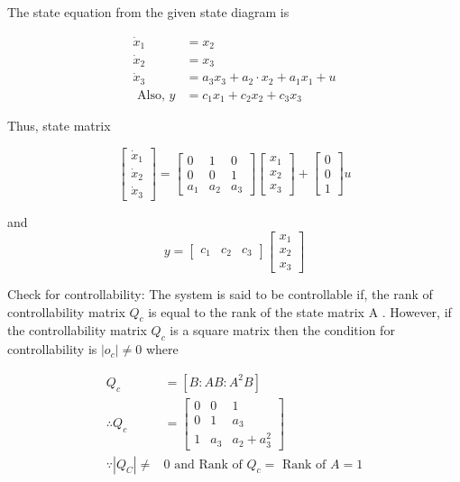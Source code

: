 \documentclass[11pt,a4paper]{article}
\begin{document}
\begin{tcolorbox}[solbox, title=Detailed Solution -- Question 99]
The state equation from the given state diagram is

\[
\begin{aligned} \dot{x}_{1} &=x_{2} \\ \dot{x}_{2} &=x_{3} \\ \dot{x}_{3} &=a_{3} x_{3}+a_{2} \cdot x_{2}+a_{1} x_{1}+u \\ \text { Also, } y &=c_{1} x_{1}+c_{2} x_{2}+c_{3} x_{3} \end{aligned}
\]

 Thus, state matrix 

\[
\left[\begin{array}{c}\dot{x}_{1} \\ \dot{x}_{2} \\ \dot{x}_{3}\end{array}\right]=\left[\begin{array}{ccc}0 & 1 & 0 \\ 0 & 0 & 1 \\ a_{1} & a_{2} & a_{3}\end{array}\right]\left[\begin{array}{c}x_{1} \\ x_{2} \\ x_{3}\end{array}\right]+\left[\begin{array}{c}0 \\ 0 \\ 1\end{array}\right] u
\]

 and 
\[
y=\left[\begin{array}{lll}c_{1} & c_{2} & c_{3}\end{array}\right]\left[\begin{array}{l}x_{1} \\ x_{2} \\ x_{3}\end{array}\right]
\]

 Check for controllability:
 The system is said to be controllable if, the rank  of controllability matrix $Q_{c}$ is equal to the rank of the state matrix A . However, if the controllability matrix $Q_{c}$ is a square matrix then the condition for controllability is
$\left|o_{c}\right| \neq 0$
 where 

\[
\begin{aligned} Q_{c}&=\left[B: A B: A^{2} B\right]\\ \therefore Q_{c}&=\left[\begin{array}{ccc}0 & 0 & 1 \\ 0 & 1 & a_{3} \\ 1 & a_{3} & a_{2}+a_{3}^{2}\end{array}\right] \\ \because\left|Q_{C}\right| \neq & 0 \text{ and Rank of } Q_{c}=\text{ Rank of }A=1 \end{aligned}
\]


\end{tcolorbox}
\end{document}
